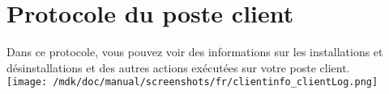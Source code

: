 \section{Protocole du poste client}Dans ce protocole, vous pouvez voir des informations sur les installations et d\'esinstallations et des autres actions ex\'ecut\'ees sur votre poste client.\\
\texttt{[image: /mdk/doc/manual/screenshots/fr/clientinfo\_clientLog.png]} \\
